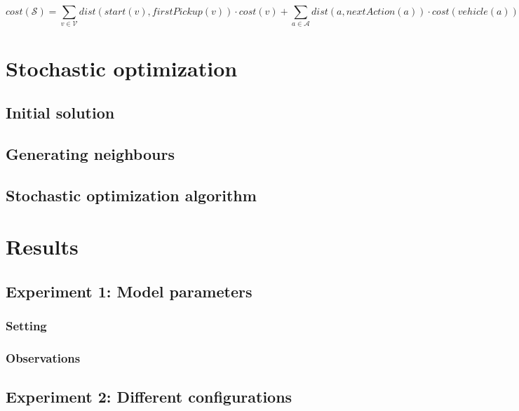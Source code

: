 \documentclass[11pt]{article}
\begin{document}
$$
cost(\mathcal{S}) = 
\sum_{v \in \mathcal{V}} dist(start(v), firstPickup(v))
\cdot cost(v)
 +
\sum_{a \in \mathcal{A}} dist(a, nextAction(a))
\cdot cost(vehicle(a))
$$


\section{Stochastic optimization}

\subsection{Initial solution}

\subsection{Generating neighbours}

\subsection{Stochastic optimization algorithm}


\section{Results}

\subsection{Experiment 1: Model parameters}

\subsubsection{Setting} 

\subsubsection{Observations}

\subsection{Experiment 2: Different configurations}
\end{document}
